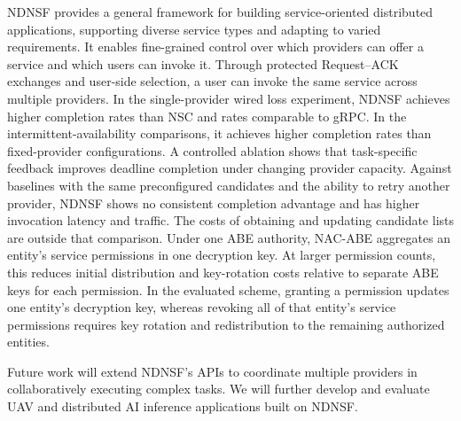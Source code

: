 NDNSF provides a general framework for building service-oriented distributed applications, supporting diverse service types and adapting to varied requirements. It enables fine-grained control over which providers can offer a service and which users can invoke it. Through protected Request--ACK exchanges and user-side selection, a user can invoke the same service across multiple providers. In the single-provider wired loss experiment, NDNSF achieves higher completion rates than NSC and rates comparable to gRPC. In the intermittent-availability comparisons, it achieves higher completion rates than fixed-provider configurations. A controlled ablation shows that task-specific feedback improves deadline completion under changing provider capacity. Against baselines with the same preconfigured candidates and the ability to retry another provider, NDNSF shows no consistent completion advantage and has higher invocation latency and traffic. The costs of obtaining and updating candidate lists are outside that comparison. Under one ABE authority, NAC-ABE aggregates an entity's service permissions in one decryption key. At larger permission counts, this reduces initial distribution and key-rotation costs relative to separate ABE keys for each permission. In the evaluated scheme, granting a permission updates one entity's decryption key, whereas revoking all of that entity's service permissions requires key rotation and redistribution to the remaining authorized entities.

Future work will extend NDNSF's APIs to coordinate multiple providers in collaboratively executing complex tasks. We will further develop and evaluate UAV and distributed AI inference applications built on NDNSF.
